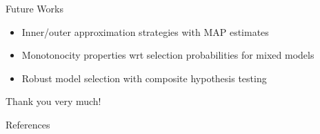 \documentclass[aspectratio=169]{beamer}					%
\begin{document}
\fi
\begin{frame}{Future Works}
\begin{itemize}

    \item \alert{Inner/outer approximation strategies with MAP estimates}
    \item \alert{Monotonocity properties wrt selection probabilities 
    for mixed models}
    \item \alert{Robust model selection with composite hypothesis testing }
\end{itemize}    
\end{frame}

\begin{frame}{}
    \centering
    \huge{Thank you very much!}
\end{frame}
\begin{frame}[allowframebreaks]{References}
\printbibliography[heading=none]
\end{frame}
\end{document}
